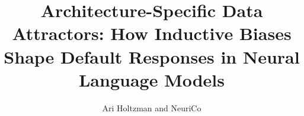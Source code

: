 \documentclass{article}
\title{Architecture-Specific Data Attractors: How Inductive Biases Shape Default Responses in Neural Language Models}
\author{Ari Holtzman and NeuriCo}
\begin{document}
\maketitle

\begin{abstract}

\end{abstract}










\end{document}
